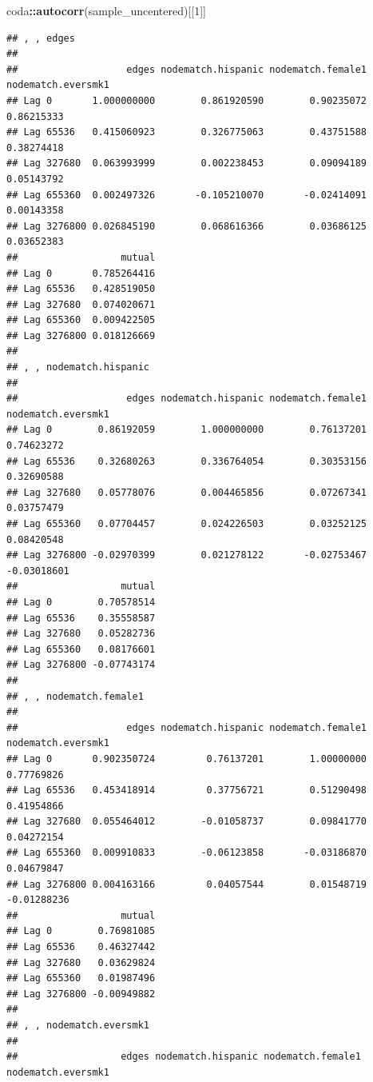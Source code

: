 \documentclass[]{book}
\newenvironment{Shaded}{\begin{snugshade}}{\end{snugshade}}
\newcommand{\DecValTok}[1]{\textcolor[rgb]{0.00,0.00,0.81}{#1}}
\newcommand{\KeywordTok}[1]{\textcolor[rgb]{0.13,0.29,0.53}{\textbf{#1}}}
\newcommand{\NormalTok}[1]{#1}
\newcommand{\OperatorTok}[1]{\textcolor[rgb]{0.81,0.36,0.00}{\textbf{#1}}}
\begin{document}
\begin{enumerate}
\begin{Shaded}
\begin{Highlighting}[]
\NormalTok{coda}\OperatorTok{::}\KeywordTok{autocorr}\NormalTok{(sample_uncentered)[[}\DecValTok{1}\NormalTok{]]}
\end{Highlighting}
\end{Shaded}

\begin{verbatim}
## , , edges
## 
##                   edges nodematch.hispanic nodematch.female1 nodematch.eversmk1
## Lag 0       1.000000000        0.861920590        0.90235072         0.86215333
## Lag 65536   0.415060923        0.326775063        0.43751588         0.38274418
## Lag 327680  0.063993999        0.002238453        0.09094189         0.05143792
## Lag 655360  0.002497326       -0.105210070       -0.02414091         0.00143358
## Lag 3276800 0.026845190        0.068616366        0.03686125         0.03652383
##                  mutual
## Lag 0       0.785264416
## Lag 65536   0.428519050
## Lag 327680  0.074020671
## Lag 655360  0.009422505
## Lag 3276800 0.018126669
## 
## , , nodematch.hispanic
## 
##                   edges nodematch.hispanic nodematch.female1 nodematch.eversmk1
## Lag 0        0.86192059        1.000000000        0.76137201         0.74623272
## Lag 65536    0.32680263        0.336764054        0.30353156         0.32690588
## Lag 327680   0.05778076        0.004465856        0.07267341         0.03757479
## Lag 655360   0.07704457        0.024226503        0.03252125         0.08420548
## Lag 3276800 -0.02970399        0.021278122       -0.02753467        -0.03018601
##                  mutual
## Lag 0        0.70578514
## Lag 65536    0.35558587
## Lag 327680   0.05282736
## Lag 655360   0.08176601
## Lag 3276800 -0.07743174
## 
## , , nodematch.female1
## 
##                   edges nodematch.hispanic nodematch.female1 nodematch.eversmk1
## Lag 0       0.902350724         0.76137201        1.00000000         0.77769826
## Lag 65536   0.453418914         0.37756721        0.51290498         0.41954866
## Lag 327680  0.055464012        -0.01058737        0.09841770         0.04272154
## Lag 655360  0.009910833        -0.06123858       -0.03186870         0.04679847
## Lag 3276800 0.004163166         0.04057544        0.01548719        -0.01288236
##                  mutual
## Lag 0        0.76981085
## Lag 65536    0.46327442
## Lag 327680   0.03629824
## Lag 655360   0.01987496
## Lag 3276800 -0.00949882
## 
## , , nodematch.eversmk1
## 
##                  edges nodematch.hispanic nodematch.female1 nodematch.eversmk1

\end{verbatim}
\end{enumerate}
\end{document}
